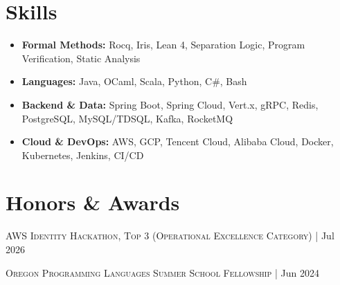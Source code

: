 \documentclass[11pt,letterpaper]{article}
\begin{document}
\section{Skills}
\begin{itemize}
  \item \textbf{Formal Methods:} Rocq, Iris, Lean 4, Separation Logic, Program Verification, Static Analysis
  \item \textbf{Languages:} Java, OCaml, Scala, Python, C\#, Bash
  \item \textbf{Backend \& Data:} Spring Boot, Spring Cloud, Vert.x, gRPC, Redis, PostgreSQL, MySQL/TDSQL, Kafka, RocketMQ
  \item \textbf{Cloud \& DevOps:} AWS, GCP, Tencent Cloud, Alibaba Cloud, Docker, Kubernetes, Jenkins, CI/CD
\end{itemize}

\section{Honors \& Awards}
\textsc{AWS Identity Hackathon, Top 3 (Operational Excellence Category)} | Jul 2026\par
\textsc{Oregon Programming Languages Summer School Fellowship} | Jun 2024\par
\end{document}
